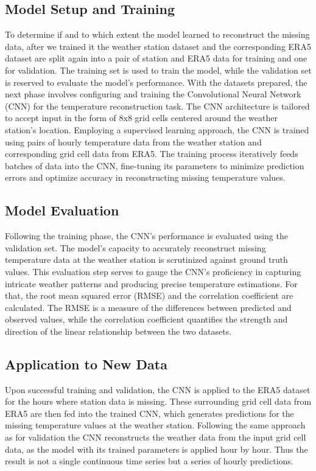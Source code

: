 \subsection{Model Setup and Training}
To determine if and to which extent the model learned to reconstruct the missing data, after we trained it the weather station dataset and the corresponding ERA5 dataset are split again into a pair of station and ERA5 data for training and one for validation. The training set is used to train the model, while the validation set is reserved to evaluate the model's performance. With the datasets prepared, the next phase involves configuring and training the Convolutional Neural Network (CNN) for the temperature reconstruction task. The CNN architecture is tailored to accept input in the form of 8x8 grid cells centered around the weather station's location. Employing a supervised learning approach, the CNN is trained using pairs of hourly temperature data from the weather station and corresponding grid cell data from ERA5. The training process iteratively feeds batches of data into the CNN, fine-tuning its parameters to minimize prediction errors and optimize accuracy in reconstructing missing temperature values.

\subsection{Model Evaluation}
Following the training phase, the CNN's performance is evaluated using the validation set. The model's capacity to accurately reconstruct missing temperature data at the weather station is scrutinized against ground truth values. This evaluation step serves to gauge the CNN's proficiency in capturing intricate weather patterns and producing precise temperature estimations. For that, the root mean squared error (RMSE) and the correlation coefficient are calculated. The RMSE is a measure of the differences between predicted and observed values, while the correlation coefficient quantifies the strength and direction of the linear relationship between the two datasets.

\subsection{Application to New Data}
Upon successful training and validation, the CNN is applied to the ERA5 dataset for the hours where station data is missing. These surrounding grid cell data from ERA5 are then fed into the trained CNN, which generates predictions for the missing temperature values at the weather station. Following the same approach as for validation the CNN reconstructs the weather data from the input grid cell data, as the model with its trained parameters is applied hour by hour. Thus the result is not a single continuous time series but a series of hourly predictions.